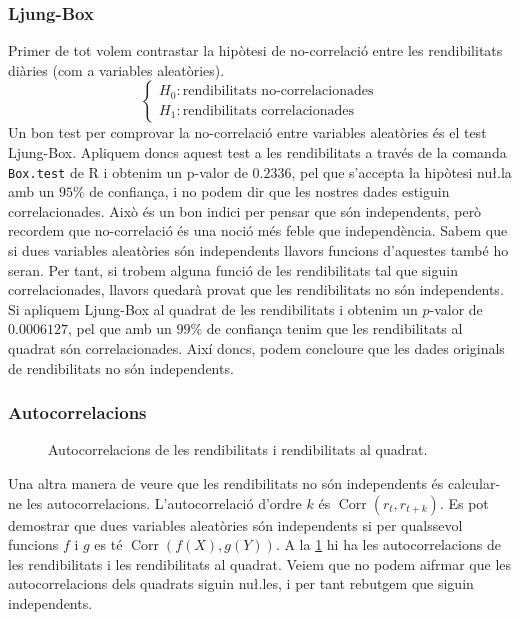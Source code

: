 \documentclass{article}
\numberwithin{table}{section}
\numberwithin{figure}{section}
\numberwithin{equation}{section}
\DeclareMathOperator{\Corr}{Corr}
\begin{document}
\subsubsection{Ljung-Box}
Primer de tot volem contrastar la hipòtesi de no-correlació entre les rendibilitats diàries (com a variables aleatòries).
\begin{equation}
  \begin{cases}
    H_0: \text{rendibilitats no-correlacionades}\\
    H_1: \text{rendibilitats correlacionades}
  \end{cases}
\end{equation}
Un bon test per comprovar la no-correlació entre variables aleatòries és el test Ljung-Box. Apliquem doncs aquest test a les rendibilitats a través de la comanda \texttt{Box.test} de \textsf{R} i obtenim un p-valor de $0.2336$, pel que s'accepta la hipòtesi nu\l.la amb un $95\%$ de confiança, i no podem dir que les nostres dades estiguin correlacionades. Això és un bon indici per pensar que són independents, però recordem que no-correlació és una noció més feble que independència. Sabem que si dues variables aleatòries són independents llavors funcions d’aquestes també ho seran. Per tant, si trobem alguna funció de les rendibilitats tal que siguin correlacionades, llavors quedarà provat que les rendibilitats no són independents. Si apliquem Ljung-Box al quadrat de les rendibilitats i obtenim un \( p \)-valor de $0.0006127$, pel que amb un $99\%$ de confiança tenim que les rendibilitats al quadrat són correlacionades. Així doncs, podem concloure que les dades originals de rendibilitats no són independents. 

\subsubsection{Autocorrelacions}
\begin{figure}[htb]
	\centering \sffamily \small
	
  \caption{Autocorrelacions de les rendibilitats i rendibilitats al quadrat.}
	\label{fig:autocorr}
\end{figure}
Una altra manera de veure que les rendibilitats no són independents és calcular-ne les autocorrelacions. L'autocorrelació d'ordre \( k \) és \( \Corr(r_t, r_{t+k}) \). Es pot demostrar que dues variables aleatòries són independents si per qualssevol funcions \( f \) i \( g \) es té \( \Corr(f(X), g(Y)) \). A la \cref{fig:autocorr} hi ha les autocorrelacions de les rendibilitats i les rendibilitats al quadrat. Veiem que no podem aifrmar que les autocorrelacions dels quadrats siguin nu\l.les, i per tant rebutgem que siguin independents. 
\end{document}
